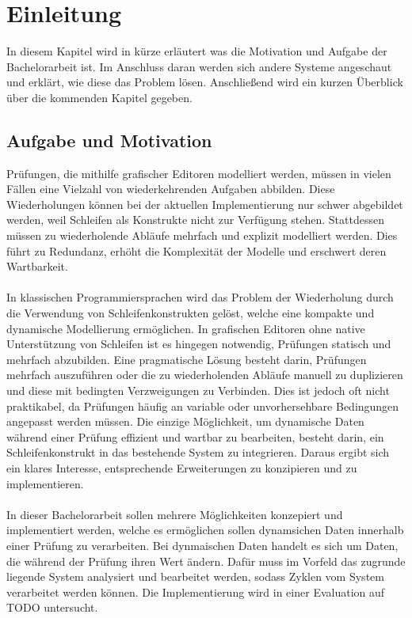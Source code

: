 \documentclass{article}
\begin{document}
    \newpage
    \tableofcontents
    \newpage
    \section{Einleitung}
    In diesem Kapitel wird in kürze erläutert was die Motivation und Aufgabe der Bachelorarbeit ist.
    Im Anschluss daran werden sich andere Systeme angeschaut und erklärt, wie diese das Problem lösen.
    Anschließend wird ein kurzen Überblick über die kommenden Kapitel gegeben.
    \subsection{Aufgabe und Motivation}
    Prüfungen, die mithilfe grafischer Editoren modelliert werden, müssen in vielen Fällen eine Vielzahl von wiederkehrenden Aufgaben abbilden. 
    Diese Wiederholungen können bei der aktuellen Implementierung nur schwer abgebildet werden, weil Schleifen als Konstrukte nicht zur Verfügung stehen. 
    Stattdessen müssen zu wiederholende Abläufe mehrfach und explizit modelliert werden. 
    Dies führt zu Redundanz, erhöht die Komplexität der Modelle und erschwert deren Wartbarkeit.\\
    \\
    In klassischen Programmiersprachen wird das Problem der Wiederholung durch die Verwendung von Schleifenkonstrukten gelöst, welche eine kompakte und dynamische Modellierung ermöglichen. 
    In grafischen Editoren ohne native Unterstützung von Schleifen ist es hingegen notwendig, Prüfungen statisch und mehrfach abzubilden. 
    Eine pragmatische Lösung besteht darin, Prüfungen mehrfach auszuführen oder die zu wiederholenden Abläufe manuell zu duplizieren und diese mit bedingten Verzweigungen zu Verbinden. 
    Dies ist jedoch oft nicht praktikabel, da Prüfungen häufig an variable oder unvorhersehbare Bedingungen angepasst werden müssen.
    Die einzige Möglichkeit, um dynamische Daten während einer Prüfung effizient und wartbar zu bearbeiten, besteht darin, ein Schleifenkonstrukt in das bestehende System zu integrieren. 
    Daraus ergibt sich ein klares Interesse, entsprechende Erweiterungen zu konzipieren und zu implementieren.\\
    \\
    In dieser Bachelorarbeit sollen mehrere Möglichkeiten konzepiert und implementiert werden, welche es ermöglichen sollen dynamsichen Daten innerhalb einer Prüfung zu verarbeiten.
    Bei dynmaischen Daten handelt es sich um Daten, die während der Prüfung ihren Wert ändern.
    Dafür muss im Vorfeld das zugrunde liegende System analysiert und bearbeitet werden, sodass Zyklen vom System verarbeitet werden können.
    Die Implementierung wird in einer Evaluation auf TODO untersucht.
\end{document}
